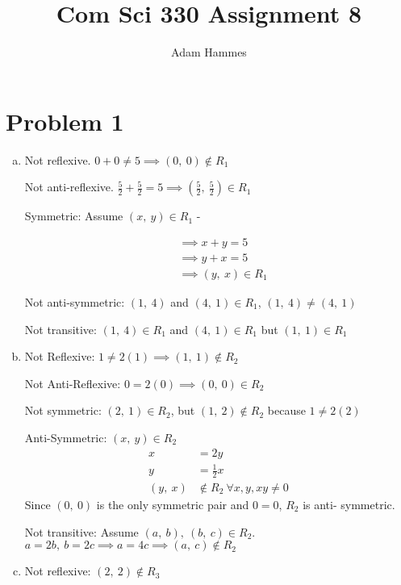 \documentclass[11pt]{article}
\begin{document}
\let\iff\leftrightarrow

\title{Com Sci 330 Assignment 8}
\author{Adam Hammes}
\maketitle

\section*{Problem 1}
	\begin{enumerate}[(a)]
	
	\item
		Not reflexive. $0+0 \neq 5 \implies (0,\ 0) \not\in R_1$
		
		Not anti-reflexive. $\frac{5}{2} + \frac{5}{2} = 5 \implies (\frac{5}{2} 
		,\ \frac{5}{2}) \in R_1$
		
		Symmetric: Assume $(x,\ y) \in R_1$ -
		
		\begin{align*}
		&\implies x+y = 5 \\
		&\implies y+x = 5 \\
		&\implies (y,\ x) \in R_1
		\end{align*}
		
		Not anti-symmetric: $(1,\ 4)$ and $ (4,\ 1) \in R_1$, $(1,\ 4) \ne (4,\ 
		1)$ 
		
		Not transitive: $(1,\ 4) \in R_1$ and $(4,\ 1) \in R_1$ but $(1,\ 1)\in 
		R_1$

	\item
		Not Reflexive: $ 1 \ne 2(1) \implies  (1,\ 1) \not\in R_2$
		
		Not Anti-Reflexive: $0 = 2(0) \implies (0,\ 0) \in R_2$
		
		Not symmetric:  $(2,\ 1) \in R_2$, but $(1,\ 2)\not\in R_2$ because $1 
		\ne 2(2)$
		
		
		Anti-Symmetric: $(x,\ y) \in R_2$
		\begin{align*}
		x &= 2y \\
		y &= \frac{1}{2}x \\
		(y,\ x) &\not\in R_2\  \forall x, y, xy \ne 0
		\end{align*}
		\indent Since $(0,\ 0)$ is the only symmetric pair and $0 = 0$, $R_2$ is anti-
		symmetric.
		
		Not transitive: Assume $(a,\ b),\ (b,\ c) \in R_2$. $a = 2b,\ b = 2c 
		\implies a = 4c \implies (a,\ c) \not\in R_2$
		
	\item
		Not reflexive: $(2,\ 2) \not\in R_3$
		

\end{enumerate}
\end{document}
